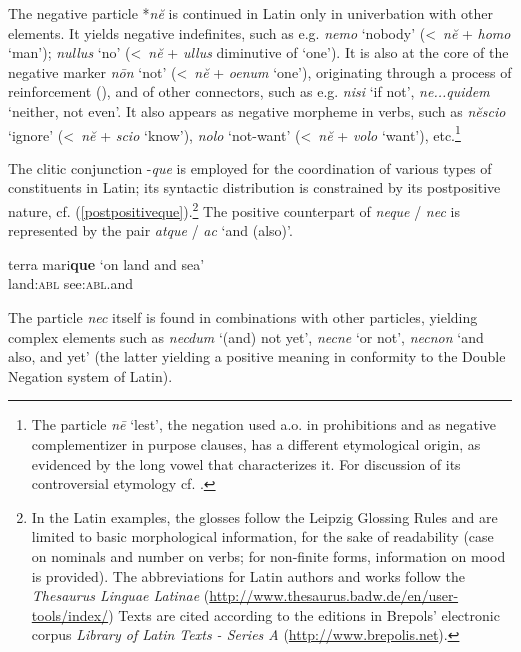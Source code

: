\documentclass[output=paper,modfonts,nonflat,citecolor=brown,
showindex
]{langsci/langscibook}
\begin{document}
The negative particle *{\emph{n\u{e}}} is continued in Latin only in univerbation with other elements. It yields negative indefinites, such as e.g. {\emph{nemo}} `nobody' (\textless \ {\emph{n\u{e}}} + {\emph{homo}} `man'); {\emph{nullus}} `no' (\textless \ {\emph{n\u{e}}} + {\emph{ullus}} diminutive of `one'). It is also at the core of the negative marker {\emph{n\=on}} `not' (\textless \ {\emph{n\u{e}}} + {\emph{oenum}} `one'), originating through a process of reinforcement (\citealt[]{Fruyt08a, Gianollo18}), and of other connectors, such as e.g. {\emph{nisi}} `if not', {\emph{ne...quidem}} `neither, not even'. It also appears as negative morpheme in verbs, such as {\emph{n\u{e}scio}} `ignore' (\textless \ {\emph{n\u{e}}} + {\emph{scio}} `know'), {\emph{nolo}} `not-want' (\textless \ {\emph{n\u{e}}} + {\emph{volo}} `want'), etc.{\footnote{The particle {\emph{n\=e}} `lest', the negation used a.o. in prohibitions and as negative complementizer in purpose clauses, has a different etymological origin, as evidenced by the long vowel that characterizes it. For discussion of its controversial etymology cf. \citet{deVaan}.}}

The clitic conjunction -{\emph{que}} is employed for the coordination of various types of constituents in Latin; its syntactic distribution is constrained by its postpositive nature, cf. (\ref{postpositiveque}).{\footnote{In the Latin examples, the glosses follow the Leipzig Glossing Rules and are limited to basic morphological information, for the sake of readability (case on nominals and number on verbs; for non-finite forms, information on mood is provided). The abbreviations for Latin authors and works follow the {\emph{Thesaurus Linguae Latinae}} (\url{http://www.thesaurus.badw.de/en/user-tools/index/}) Texts are cited according to the editions in Brepols' electronic corpus {\emph{Library of Latin Texts - Series A}} (\url{http://www.brepolis.net}).}} The positive counterpart of {\emph{neque}} / {\emph{nec}} is represented by the pair {\emph{atque}} / {\emph{ac}} `and (also)'.

{\begin{exe}
\ex \label{postpositiveque} \gll terra mari{\textbf{que}} \hfill `on land and sea'\\
land:{\textsc{abl}} see:{\textsc{abl}}.and\\
\end{exe}}

\noindent The particle {\emph{nec}} itself is found in combinations with other particles, yielding complex elements such as {\emph{necdum}} `(and) not yet', {\emph{necne}} `or not', {\emph{necnon}} `and also, and yet' (the latter yielding a positive meaning in conformity to the Double Negation system of Latin).
\end{document}
